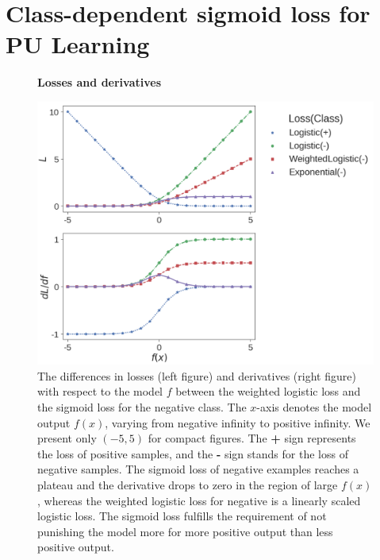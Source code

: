 \section{Class-dependent sigmoid loss for PU Learning}
\label{sec:pulearning}



\begin{figure}[t]
\centering
\textbf{Losses and derivatives}\par\medskip
   \includegraphics[width=1.05\linewidth]{img/losses}
\caption{
The differences in losses (left figure) and derivatives (right figure) with respect to the model $f$ between the weighted logistic loss and the sigmoid loss for the negative class.
The $x$-axis denotes the model output $f(x)$, varying from negative infinity to positive infinity.
We present only $(-5,5)$ for compact figures.
The \textbf{+} sign represents the loss of positive samples, and the \textbf{-} sign stands for the loss of negative samples.
The sigmoid loss of negative examples reaches a plateau and the derivative drops to zero in the region of large $f(x)$, whereas the weighted logistic loss for negative is a linearly scaled logistic loss.
The sigmoid loss fulfills the requirement of not punishing the model more for more positive output than less positive output.
}
\label{fig:losses}
\end{figure}


